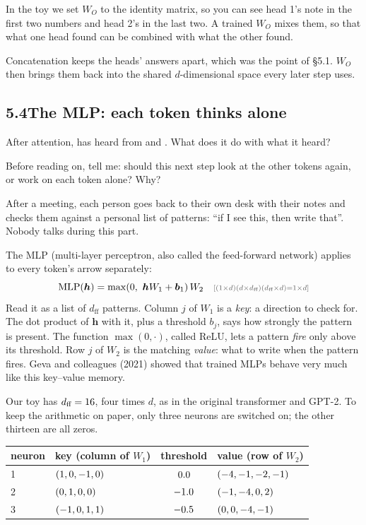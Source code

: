 In the toy we set $W_O$ to the identity matrix, so you can see head 1's note in the first two numbers and head
2's in the last two. A trained $W_O$ mixes them, so that what one head found can be combined with what the other
found.

\Why Concatenation keeps the heads' answers apart, which was the point of \S5.1. $W_O$ then brings them back
into the shared $d$-dimensional space every later step uses.


\subsection*{5.4\quad The MLP: each token thinks alone}

After attention,  has heard from  and . What does it do with what it heard?

\Predict Before reading on, tell me: should this next step look at the other tokens again, or work on each
token alone? Why?

\Picture After a meeting, each person goes back to their own desk with their notes and checks them against a
personal list of patterns: ``if I see this, then write that''. Nobody talks during this part.

\Exactly The MLP (multi-layer perceptron, also called the feed-forward network) applies to every token's
arrow separately:
\[
\operatorname{MLP}(\bm{h}) = \max(0,\ \bm{h}W_1 + \bm{b}_1)\,W_2
\shape{(1\times d)(d\times d_{\text{ff}})(d_{\text{ff}}\times d)=1\times d}
\]
Read it as a list of $d_{\text{ff}}$ patterns. Column $j$ of $W_1$ is a \emph{key}: a direction to check for.
The dot product of $\bm{h}$ with it, plus a threshold $b_j$, says how strongly the pattern is present. The
function $\max(0,\cdot)$, called ReLU, lets a pattern \emph{fire} only above its threshold. Row $j$ of $W_2$ is
the matching \emph{value}: what to write when the pattern fires. Geva and colleagues (2021) showed that trained
MLPs behave very much like this key--value memory.

Our toy has $d_{\text{ff}}=16$, four times $d$, as in the original transformer and GPT-2. To keep the
arithmetic on paper, only three neurons are switched on; the other thirteen are all zeros.

\begin{center}
\small
\begin{tabular}{@{}l l c l@{}}
\toprule
neuron & key (column of $W_1$) & threshold & value (row of $W_2$)\\
\midrule
1 & $(1, 0, -1, 0)$ & $0.0$ & $(-4, -1, -2, -1)$\\
2 & $(0, 1, 0, 0)$ & $-1.0$ & $(-1, -4, 0, 2)$\\
3 & $(-1, 0, 1, 1)$ & $-0.5$ & $(0, 0, -4, -1)$\\
\bottomrule
\end{tabular}
\end{center}

